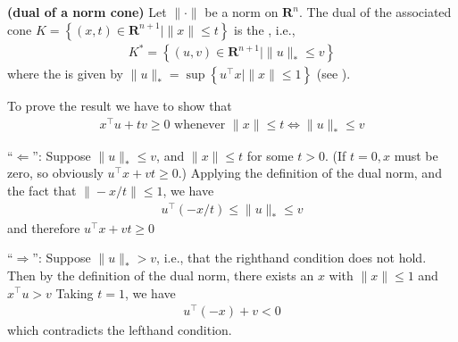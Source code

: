 \documentclass{article}
\newcommand{\bfs}[1]{\textbf{({#1}) }}
\begin{document}
\begin{exma}{\bfs{dual of a norm cone}}
  Let $\|\cdot\|$ be a norm on $\mathbf{R}^{n}$. The dual of the associated cone $K=\left\{(x, t) \in \mathbf{R}^{n+1} \mid\|x\| \leq t\right\}$ is the , i.e.,
\begin{align*}
K^{*}=\left\{(u, v) \in \mathbf{R}^{n+1} \mid\|u\|_{*} \leq v\right\}
\end{align*} 
where the  is given by $\|u\|_{*}=\sup \left\{u^{\top} x \mid\|x\| \leq 1\right\}$ (see \cite[P326]{horn2012matrix}).

To prove the result we have to show that
\begin{align*}
x^{\top} u+t v \geq 0 \text { whenever }\|x\| \leq t \Longleftrightarrow\|u\|_{*} \leq v
\end{align*}

``$\Leftarrow$'': Suppose $\|u\|_{*} \leq v$, and $\|x\| \leq t$ for some $t>0$. (If $t=0, x$ must be zero, so obviously $u^{\top} x+v t \geq 0$.) Applying the definition of the dual norm, and the fact that $\|-x / t\| \leq 1$, we have
\begin{align*}
u^{\top}(-x / t) \leq\|u\|_{*} \leq v
\end{align*}
and therefore $u^{\top} x+v t \geq 0$

``$\Rightarrow$'': Suppose $\|u\|_{*}>v$, i.e., that the righthand condition does not hold. Then by the definition of the dual norm, there exists an $x$ with $\|x\| \leq 1$ and $x^{\top} u>v$ Taking $t=1$, we have
\begin{align*}
u^{\top}(-x)+v<0
\end{align*}
which contradicts the lefthand condition.
\end{exma}
\end{document}
